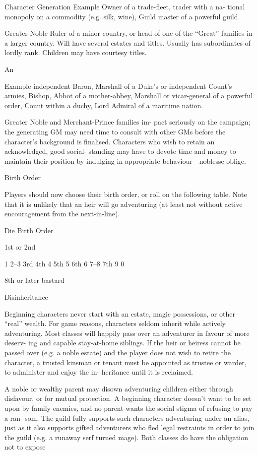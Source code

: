 \begin{Chapter}{Character Generation}
Example  
Owner  of  a  trade-fleet,  trader  with  a  na-
tional  monopoly  on  a  commodity  (e.g.  silk,  wine),  Guild 
master of a powerful guild. 

Greater  Noble  Ruler  of  a  minor  country,  or  head 
of  one  of  the  “Great”  families  in  a  larger  country. 
Will  have  several  estates  and  titles.  Usually  has 
subordinates  of  lordly  rank.  Children  may  have 
courtesy titles. 

An 

Example 
independent  Baron,  Marshall  of  a 
Duke’s or independent Count’s armies, Bishop, Abbot of a 
mother-abbey,  Marshall  or  vicar-general  of  a  powerful 
order, Count within a duchy,  Lord  Admiral  of a  maritime 
nation. 

Greater  Noble  and  Merchant-Prince  families  im-
pact seriously on the campaign; the generating GM 
may  need  time  to  consult  with  other  GMs  before 
the  character’s  background is  finalised. Characters 
who  wish to  retain an  acknowledged,  good  social-
standing  may  have  to  devote  time  and  money  to 
maintain their position by indulging in appropriate 
behaviour - noblesse oblige. 

Birth Order 

Players should now choose their birth order, or roll 
on the following table. Note that it is unlikely that 
an  heir  will  go  adventuring  (at  least  not  without 
active encouragement from the next-in-line). 

Die   Birth Order 

1st or 2nd 

1  
2–3   3rd 
4th 
4  
5th 
5  
6th 
6  
7–8   7th 
9  
0  

8th or later 
bastard 

Disinheritance 

Beginning  characters  never  start  with  an  estate, 
magic  possessions,  or  other  “real”  wealth.  For 
game  reasons,  characters  seldom  inherit  while 
actively  adventuring.  Most  classes  will  happily 
pass over  an adventurer  in  favour  of more  deserv-
ing and capable stay-at-home siblings. If the heir or 
heiress cannot  be  passed  over  (e.g.  a  noble  estate) 
and the player does not wish to retire the character, 
a  trusted  kinsman  or  tenant  must  be  appointed  as 
trustee  or  warder,  to  administer  and  enjoy  the  in-
heritance until it is reclaimed. 

A noble or wealthy parent may disown adventuring 
children  either  through  disfavour,  or  for  mutual 
protection.  A  beginning  character  doesn’t  want  to 
be  set  upon  by  family  enemies,  and  no  parent 
wants  the  social  stigma  of  refusing  to  pay  a  ran-
som.  The  guild  fully  supports  such  characters 
adventuring  under  an  alias, just  as it also  supports 
gifted adventurers who fled legal restraints in order 
to join the guild (e.g. a runaway serf turned mage). 
Both  classes  do  have  the  obligation  not  to  expose 


\end{Chapter}
